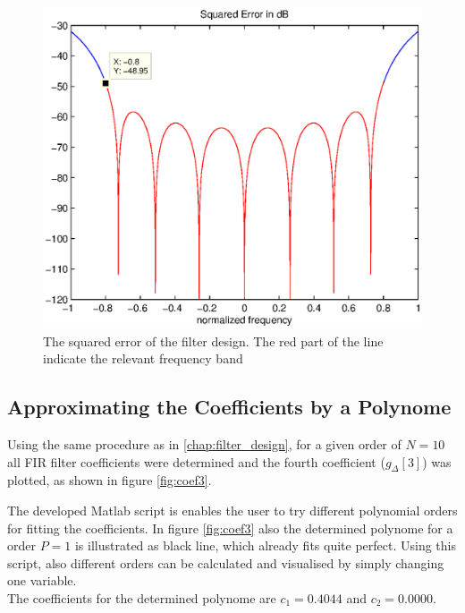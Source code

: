 \begin{figure}[h]
\centering
\includegraphics[width=\textwidth]{pics/fig2.eps}
\caption{The squared error of the filter design. The red part of the line indicate the relevant frequency band}
\label{fig:error}
\end{figure}

\subsection{Approximating the Coefficients by a Polynome}
\label{chap:poly}
Using the same procedure as in \ref{chap:filter_design}, for a given order of $N=10$ all FIR filter coefficients were determined and the fourth coefficient ($g_\Delta [3]$) was plotted, as shown in figure \ref{fig:coef3}.

The developed Matlab script is enables the user to try different polynomial orders for fitting the coefficients. In figure \ref{fig:coef3} also the determined polynome for a order $P=1$ is illustrated as black line, which already fits quite perfect. Using this script, also different orders can be calculated and visualised by simply changing one variable.\\
The coefficients for the determined polynome are $c_1 = 0.4044$ and $c_2 = 0.0000$.

